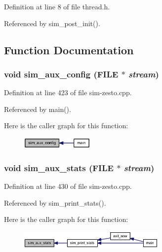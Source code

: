 Definition at line 8 of file thread.h.

Referenced by sim\_\-post\_\-init().

\subsection{Function Documentation}
\subsubsection[{sim\_\-aux\_\-config}]{\setlength{\rightskip}{0pt plus 5cm}void sim\_\-aux\_\-config (FILE $\ast$ {\em stream})}\label{thread_8h_67e5d7a21600d2eb1fb2f0798fc24a7c}




Definition at line 423 of file sim-zesto.cpp.

Referenced by main().

Here is the caller graph for this function:\nopagebreak
\begin{figure}[H]
\begin{center}
\leavevmode
\includegraphics[width=101pt]{thread_8h_67e5d7a21600d2eb1fb2f0798fc24a7c_icgraph}
\end{center}
\end{figure}
\subsubsection[{sim\_\-aux\_\-stats}]{\setlength{\rightskip}{0pt plus 5cm}void sim\_\-aux\_\-stats (FILE $\ast$ {\em stream})}\label{thread_8h_f0d3b44eaaad1fd53b38c9f82deb05fd}




Definition at line 430 of file sim-zesto.cpp.

Referenced by sim\_\-print\_\-stats().

Here is the caller graph for this function:\nopagebreak
\begin{figure}[H]
\begin{center}
\leavevmode
\includegraphics[width=204pt]{thread_8h_f0d3b44eaaad1fd53b38c9f82deb05fd_icgraph}
\end{center}
\end{figure}
